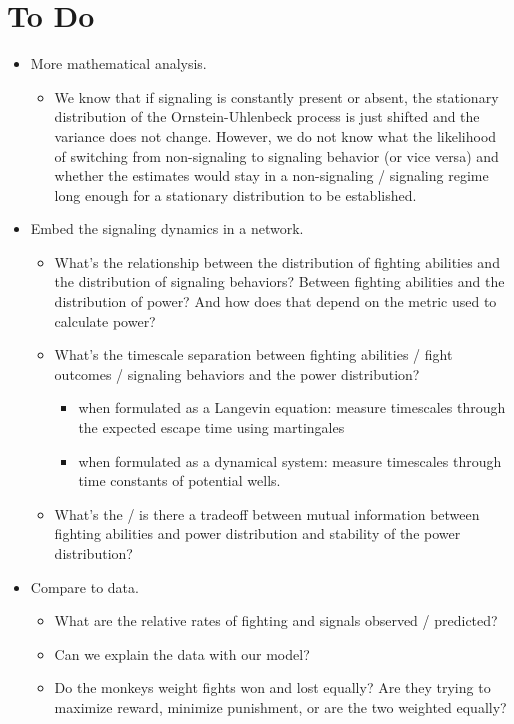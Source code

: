 \documentclass{article}
\begin{document}
\section{To Do }

\begin{itemize}
\item More mathematical analysis.
\begin{itemize}
\item We know that if signaling is constantly present or absent, the stationary distribution of the Ornstein-Uhlenbeck process is just shifted and the variance does not change.  However, we do not know what the likelihood of switching from non-signaling to signaling behavior (or vice versa) and whether the estimates would stay in a non-signaling / signaling regime long enough for a stationary distribution to be established.
\end{itemize}
\item Embed the signaling dynamics in a network.  
\begin{itemize}
\item What's the relationship between the distribution of fighting abilities and the distribution of signaling behaviors?  Between fighting abilities and the distribution of power?  And how does that depend on the metric used to calculate power?
\item What's the timescale separation between fighting abilities / fight outcomes / signaling behaviors and the power distribution?  
	\begin{itemize}
	\item when formulated as a Langevin equation: measure timescales through the expected escape time using martingales
	\item when formulated as a dynamical system: measure timescales through time constants of potential wells.
	\end{itemize}
\item What's the / is there a tradeoff between mutual information between fighting abilities and power distribution and stability of the power distribution?
\end{itemize}
\item Compare to data.
	\begin{itemize}
	\item What are the relative rates of fighting and signals observed / predicted?
	\item Can we explain the data with our model?
	\item Do the monkeys weight fights won and lost equally?  Are they trying to maximize reward, minimize punishment, or are the two weighted equally?

\end{itemize}
\end{itemize}
\end{document}
